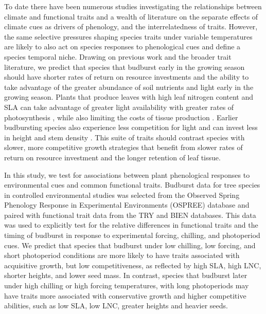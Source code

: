 \documentclass{article}\usepackage[]{graphicx}\usepackage[]{color}
\begin{document}
To date there have been numerous studies investigating the relationships between climate and functional traits and a wealth of literature on the separate effects of climate cues as drivers of phenology, and the interrelatedness of traits. However, the same selective pressures shaping species traits under variable temperatures are likely to also act on species responses to phenological cues and define a species temporal niche. Drawing on previous work and the broader trait literature, we predict that species that budburst early in the growing season should have shorter rates of return on resource investments and the ability to take advantage of the greater abundance of soil nutrients and light early in the growing season. Plants that produce leaves with high leaf nitrogen content and SLA can take advantage of greater light availability with greater rates of photosynthesis \citep{Wright2004,Pereira2020}, while also limiting the costs of tissue production \citep{Lambers2004, Westoby2006, Herault2011}. Earlier budbursting species also experience less competition for light and can invest less in height and stem density \citep{Laughlin2010}. This suite of traits should contrast species with slower, more competitive growth strategies that benefit from slower rates of return on resource investment and the longer retention of leaf tissue. 

In this study, we test for associations between plant phenological responses to environmental cues and common functional traits. Budburst data for tree species in controlled environmental studies was selected from the Observed Spring Phenology Response in Experimental Environments (OSPREE) database and paired with functional trait data from the TRY and BIEN databases. This data was used to explicitly test for the relative differences in functional traits and the timing of budburst in response to experimental forcing, chilling, and photoperiod cues. We predict that species that budburst under low chilling, low forcing, and short photoperiod conditions are more likely to have traits associated with acquisitive growth, but low competitiveness, as reflected by high SLA, high LNC, shorter heights, and lower seed mass. In contrast, species that budburst later under high chilling or high forcing temperatures, with long photoperiods may have traits more associated with conservative growth and higher competitive abilities, such as low SLA, low LNC, greater heights and heavier seeds. 
\end{document}
